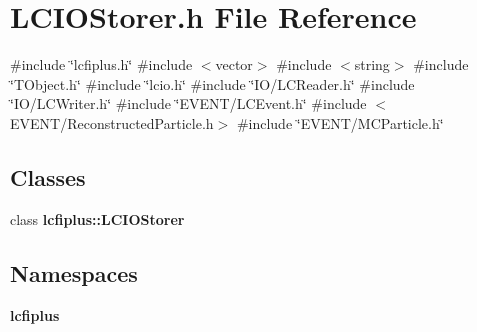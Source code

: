\section{L\+C\+I\+O\+Storer.\+h File Reference}
\label{LCIOStorer_8h}
{\ttfamily \#include \char`\"{}lcfiplus.\+h\char`\"{}}\newline
{\ttfamily \#include $<$vector$>$}\newline
{\ttfamily \#include $<$string$>$}\newline
{\ttfamily \#include \char`\"{}T\+Object.\+h\char`\"{}}\newline
{\ttfamily \#include \char`\"{}lcio.\+h\char`\"{}}\newline
{\ttfamily \#include \char`\"{}I\+O/\+L\+C\+Reader.\+h\char`\"{}}\newline
{\ttfamily \#include \char`\"{}I\+O/\+L\+C\+Writer.\+h\char`\"{}}\newline
{\ttfamily \#include \char`\"{}E\+V\+E\+N\+T/\+L\+C\+Event.\+h\char`\"{}}\newline
{\ttfamily \#include $<$E\+V\+E\+N\+T/\+Reconstructed\+Particle.\+h$>$}\newline
{\ttfamily \#include \char`\"{}E\+V\+E\+N\+T/\+M\+C\+Particle.\+h\char`\"{}}\newline
\subsection*{Classes}
\begin{DoxyCompactItemize}
\item 
class \textbf{ lcfiplus\+::\+L\+C\+I\+O\+Storer}
\end{DoxyCompactItemize}
\subsection*{Namespaces}
\begin{DoxyCompactItemize}
\item 
 \textbf{ lcfiplus}
\end{DoxyCompactItemize}
